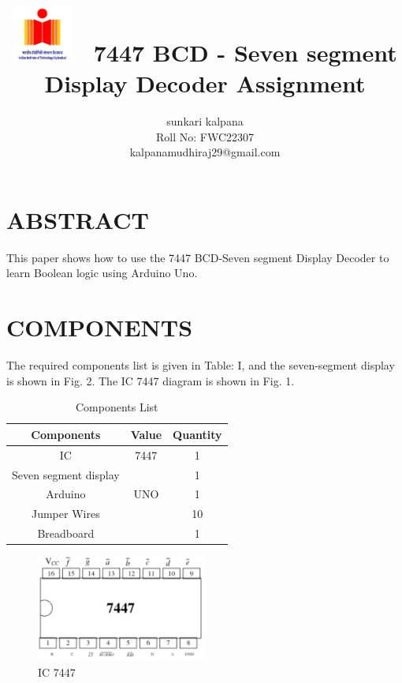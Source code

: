 \documentclass[conference]{IEEEtran}
\title{
\vspace{1cm}
{\includegraphics[width=0.15\textwidth]{744701.jpg} \
7447 BCD - Seven segment Display Decoder Assignment} }
\author{sunkari kalpana\\ Roll No: FWC22307 \\kalpanamudhiraj29@gmail.com}
\begin{document}
\maketitle

\section{ABSTRACT}
This paper shows how to use the 7447 BCD-Seven segment Display Decoder to learn Boolean logic using Arduino Uno.

\section{COMPONENTS}
The required components list is given in Table: I, and the seven-segment display is shown in Fig. 2. The IC 7447 diagram is shown in Fig. 1.
\vspace{0.3cm}

\begin{table}[htbp]
\centering
\begin{tabular}{| c | c | c |}
\hline
Components & Value & Quantity \\
\hline
IC & 7447 & 1 \\
\hline
Seven segment display & & 1 \\
\hline
Arduino & UNO & 1 \\
\hline
Jumper Wires & & 10 \\
\hline
Breadboard & & 1 \\
\hline
\end{tabular}
\vspace{0.3cm}
\caption{\label{tab:widgets} Components List}
\end{table}

\begin{figure}[htbp]                           
\centering                            
\includegraphics[width=0.5\textwidth]{7447022.jpg}                      
\caption{\label{fig-1:Gates} IC 7447}           
\end{figure}
\end{document}
